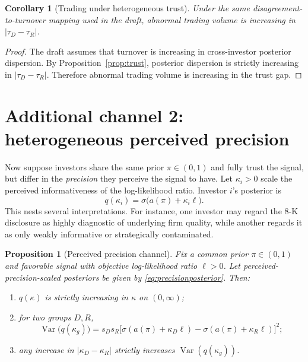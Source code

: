 \documentclass[12pt]{article}
\newtheorem{proposition}{Proposition}
\newtheorem{corollary}{Corollary}
\begin{document}
\begin{corollary}[Trading under heterogeneous trust]\label{cor:trustvolume}
Under the same disagreement-to-turnover mapping used in the draft, abnormal trading volume is increasing in $|\tau_D-\tau_R|$.
\end{corollary}

\begin{proof}
The draft assumes that turnover is increasing in cross-investor posterior dispersion. By Proposition~\ref{prop:trust}, posterior dispersion is strictly increasing in $|\tau_D-\tau_R|$. Therefore abnormal trading volume is increasing in the trust gap.
\end{proof}

\section{Additional channel 2: heterogeneous perceived precision}

Now suppose investors share the same prior $\pi\in(0,1)$ and fully trust the signal, but differ in the \emph{precision} they perceive the signal to have. Let $\kappa_i>0$ scale the perceived informativeness of the log-likelihood ratio. Investor $i$'s posterior is
\begin{equation}\label{eq:precisionposterior}
    q(\kappa_i)=\sigma\!\big(a(\pi)+\kappa_i\ell\big).
\end{equation}
This nests several interpretations. For instance, one investor may regard the 8-K disclosure as highly diagnostic of underlying firm quality, while another regards it as only weakly informative or strategically contaminated.

\begin{proposition}[Perceived precision channel]\label{prop:precision}
Fix a common prior $\pi\in(0,1)$ and favorable signal with objective log-likelihood ratio $\ell>0$. Let perceived-precision-scaled posteriors be given by \eqref{eq:precisionposterior}. Then:
\begin{enumerate}
    \item $q(\kappa)$ is strictly increasing in $\kappa$ on $(0,\infty)$;
    \item for two groups $D,R$,
    \[
        \operatorname{Var}\big(q(\kappa_g)\big)=s_Ds_R\big[\sigma(a(\pi)+\kappa_D\ell)-\sigma(a(\pi)+\kappa_R\ell)\big]^2;
    \]
    \item any increase in $|\kappa_D-\kappa_R|$ strictly increases \(\operatorname{Var}(q(\kappa_g))\).
\end{enumerate}
\end{proposition}
\end{document}

